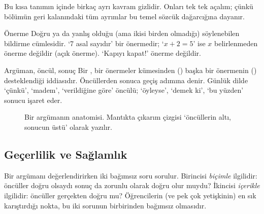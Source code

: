 Bu kısa tanımın içinde birkaç ayrı kavram gizlidir. Onları tek tek açalım; çünkü bölümün geri kalanındaki tüm ayrımlar bu temel sözcük dağarcığına dayanır.

\begin{tanim}{Önerme}
Doğru ya da yanlış olduğu (ama ikisi birden olmadığı) söylenebilen bildirme cümlesidir. ‘7 asal sayıdır’ bir önermedir; ‘$x+2=5$’ ise $x$ belirlenmeden önerme değildir (açık önerme). ‘Kapıyı kapat!’ önerme değildir.
\end{tanim}

\begin{tanim}{Argüman, öncül, sonuç}
Bir , bir önermeler kümesinden () başka bir önermenin () desteklendiği iddiasıdır. Öncüllerden sonuca geçiş adımına  denir. Günlük dilde ‘çünkü’, ‘madem’, ‘verildiğine göre’ öncülü; ‘öyleyse’, ‘demek ki’, ‘bu yüzden’ sonucu işaret eder.
\end{tanim}

\begin{figure}[h]
\centering
{}
\caption{Bir argümanın anatomisi. Mantıkta çıkarım çizgisi ‘öncüllerin altı, sonucun üstü’ olarak yazılır.}
\end{figure}

\subsection{Geçerlilik ve Sağlamlık}

Bir argümanı değerlendirirken iki bağımsız soru sorulur. Birincisi \emph{biçimle} ilgilidir: öncüller doğru olsaydı sonuç da zorunlu olarak doğru olur muydu? İkincisi \emph{içerikle} ilgilidir: öncüller gerçekten doğru mu? Öğrencilerin (ve pek çok yetişkinin) en sık karıştırdığı nokta, bu iki sorunun birbirinden bağımsız olmasıdır.

